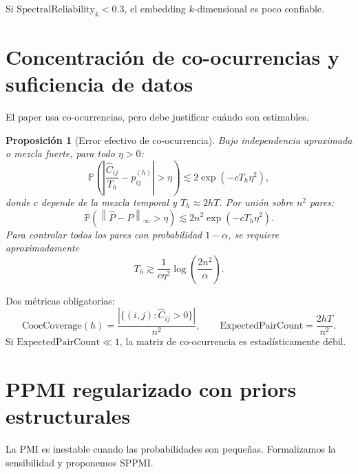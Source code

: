 \documentclass[11pt,a4paper]{article}
\newtheorem{proposition}[theorem]{Proposición}
\newcommand{\Prob}{\mathbb{P}}
\newcommand{\1}{\mathbf{1}}
\newcommand{\norm}[1]{\left\lVert #1 \right\rVert}
\numberwithin{equation}{section}
\begin{document}
Si $\mathrm{SpectralReliability}_k<0.3$, el embedding $k$-dimensional es poco confiable.

\section{Concentración de co-ocurrencias y suficiencia de datos}

El paper usa co-ocurrencias, pero debe justificar cuándo son estimables.

\begin{proposition}[Error efectivo de co-ocurrencia]
\label{prop:cooc_concentration}
Bajo independencia aproximada o mezcla fuerte, para todo $\eta>0$:
\begin{equation}
    \Prob\left(\left|\frac{\widehat C_{ij}}{T_h}-p_{ij}^{(h)}\right|>\eta\right)
    \lesssim
    2\exp(-cT_h\eta^2),
\end{equation}
donde $c$ depende de la mezcla temporal y $T_h\approx 2hT$. Por unión sobre $n^2$ pares:
\begin{equation}
    \Prob\left(\norm{\widehat P-P}_\infty>\eta\right)
    \lesssim 2n^2\exp(-cT_h\eta^2).
\end{equation}
Para controlar todos los pares con probabilidad $1-\alpha$, se requiere aproximadamente
\begin{equation}
    T_h\gtrsim\frac{1}{c\eta^2}\log\left(\frac{2n^2}{\alpha}\right).
\end{equation}
\end{proposition}

Dos métricas obligatorias:
\begin{equation}
    \mathrm{CoocCoverage}(h)=\frac{|\{(i,j):\widehat C_{ij}>0\}|}{n^2},
    \qquad
    \mathrm{ExpectedPairCount}=\frac{2hT}{n^2}.
\end{equation}
Si $\mathrm{ExpectedPairCount}\ll 1$, la matriz de co-ocurrencia es estadísticamente débil.

\section{PPMI regularizado con priors estructurales}
\label{sec:sppmi}

La PMI es inestable cuando las probabilidades son pequeñas. Formalizamos la sensibilidad y proponemos SPPMI.
\end{document}
